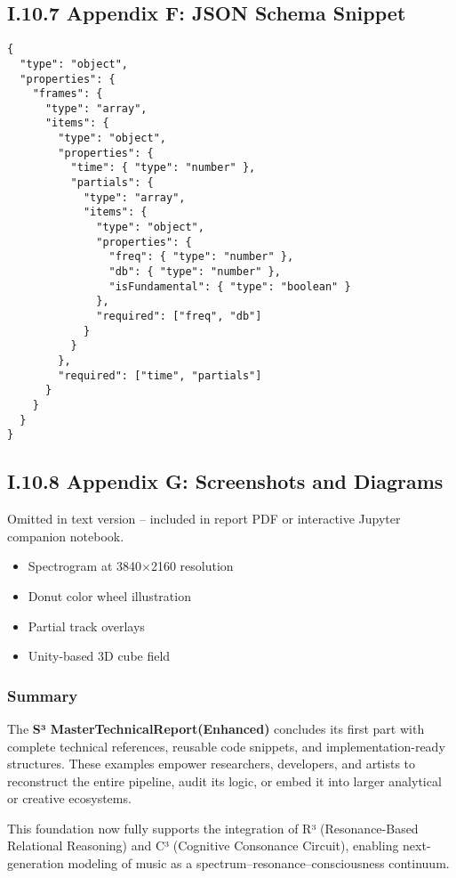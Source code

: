 \subsection*{I.10.7 Appendix F: JSON Schema Snippet}

\begin{verbatim}
{
  "type": "object",
  "properties": {
    "frames": {
      "type": "array",
      "items": {
        "type": "object",
        "properties": {
          "time": { "type": "number" },
          "partials": {
            "type": "array",
            "items": {
              "type": "object",
              "properties": {
                "freq": { "type": "number" },
                "db": { "type": "number" },
                "isFundamental": { "type": "boolean" }
              },
              "required": ["freq", "db"]
            }
          }
        },
        "required": ["time", "partials"]
      }
    }
  }
}
\end{verbatim}

\subsection*{I.10.8 Appendix G: Screenshots and Diagrams}

Omitted in text version – included in report PDF or interactive Jupyter companion notebook.

\begin{itemize}
    \item Spectrogram at 3840×2160 resolution
    \item Donut color wheel illustration
    \item Partial track overlays
    \item Unity-based 3D cube field
\end{itemize}

\subsubsection*{Summary}

The \textbf{S³ MasterTechnicalReport(Enhanced)} concludes its first part with complete technical references, reusable code snippets, and implementation-ready structures. These examples empower researchers, developers, and artists to reconstruct the entire pipeline, audit its logic, or embed it into larger analytical or creative ecosystems.

This foundation now fully supports the integration of R³ (Resonance-Based Relational Reasoning) and C³ (Cognitive Consonance Circuit), enabling next-generation modeling of music as a spectrum–resonance–consciousness continuum.

